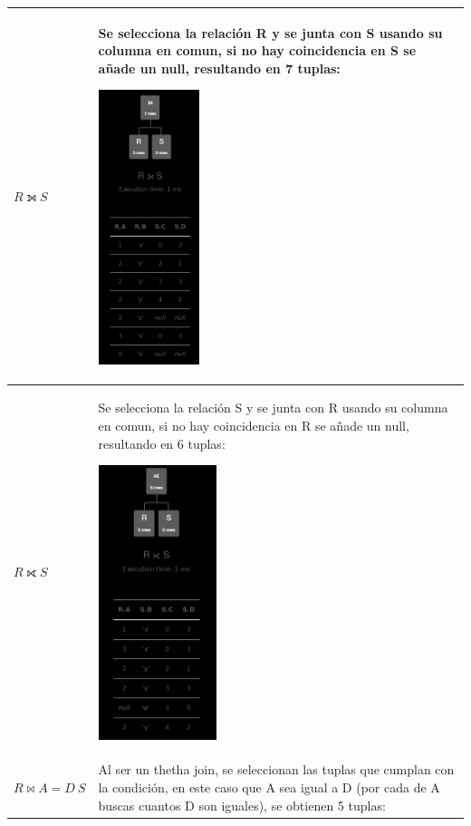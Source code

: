 \begin{longtable}{|p{4.3cm}|p{12cm}|}
    \textbf{$R \leftouterjoin S$} & 
    Se selecciona la relación R y se junta con S usando su columna en comun, si no hay coincidencia en S se añade un null, resultando en 7 tuplas:
    
    \begin{center}
        \includegraphics[height=8cm]{../resources/pregunta1/1.3.png}
    \end{center}
    \\ \hline
    
    \textbf{$R \rightouterjoin S$} & 
    Se selecciona la relación S y se junta con R usando su columna en comun, si no hay coincidencia en R se añade un null, resultando en 6 tuplas:

    \begin{center}
        \includegraphics[height=8cm]{../resources/pregunta1/1.4.png}
    \end{center}
    \\ \hline
    
    \textbf{$R \bowtie A = D \ S$} & 
    Al ser un thetha join, se seleccionan las tuplas que cumplan con la condición, en este caso que A sea igual a D (por cada de A buscas cuantos D son iguales), se obtienen 5 tuplas:


\end{longtable}
